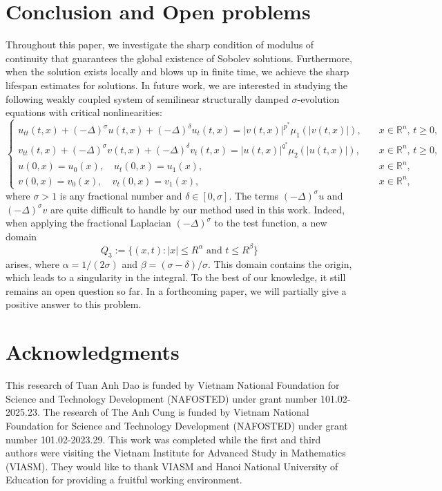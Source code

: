 \documentclass[11pt,reqno]{amsart}
\numberwithin{equation}{section}
\theoremstyle{plain}
\begin{document}
\section{Conclusion and Open problems}
Throughout this paper, we investigate the sharp condition of modulus of continuity that guarantees the global existence of Sobolev solutions. Furthermore, when the solution exists locally and blows up in finite time, we achieve the sharp lifespan estimates for solutions. In future work, we are interested in studying the following weakly coupled system of semilinear structurally damped $\sigma$-evolution equations with critical nonlinearities:
\begin{equation*}
\begin{cases}
    u_{tt}(t,x)+(-\Delta)^{\sigma} u(t,x)+(-\Delta)^{\delta}u_t(t,x)=|v(t,x)|^{p^*}\mu_1(|v(t,x)|),\quad &x\in \mathbb{R}^n,\, t\geq 0,\\
    v_{tt}(t,x)+(-\Delta)^{\sigma} v(t,x)+(-\Delta)^{\delta}v_t(t,x)=|u(t,x)|^{q^*}\mu_2(|u(t,x)|),\quad &x\in \mathbb{R}^n,\, t\geq 0,\\
    u(0,x)= u_0(x),\quad u_t(0,x)= u_1(x),\quad &x\in \mathbb{R}^n,\\
    v(0,x)= v_0(x),\quad v_t(0,x)= v_1(x),\quad &x\in \mathbb{R}^n,
\end{cases}
\end{equation*}
where $\sigma>1$ is any fractional number and $\delta\in [0,\sigma]$. The terms $(-\Delta)^{\sigma}u$ and $(-\Delta)^{\sigma}v$ are quite difficult to handle by our method used in this work. Indeed, when applying the fractional Laplacian $(-\Delta)^{\sigma}$ to the test function, a new domain $$ Q_3:=\{(x,t):|x|\leq R^{\alpha}\text{ and }t\leq R^{\beta}\}$$
arises, where $\alpha=1/(2\sigma)$ and $\beta=(\sigma-\delta)/\sigma$. This domain contains the origin, which leads to a singularity in the integral. To the best of our knowledge, it still remains an open question so far. In a forthcoming paper, we will partially give a positive answer to this problem.



\section*{Acknowledgments}
This research of Tuan Anh Dao is funded by Vietnam National Foundation for Science and Technology Development (NAFOSTED) under grant number 101.02-2025.23. The research of The Anh Cung is funded by Vietnam National Foundation for Science and Technology Development (NAFOSTED) under grant number 101.02-2023.29. This work was completed while the first and third authors were visiting the Vietnam Institute for  Advanced Study in Mathematics (VIASM). They would like to thank VIASM and Hanoi National University of Education for providing a fruitful working environment. \medskip
\end{document}
